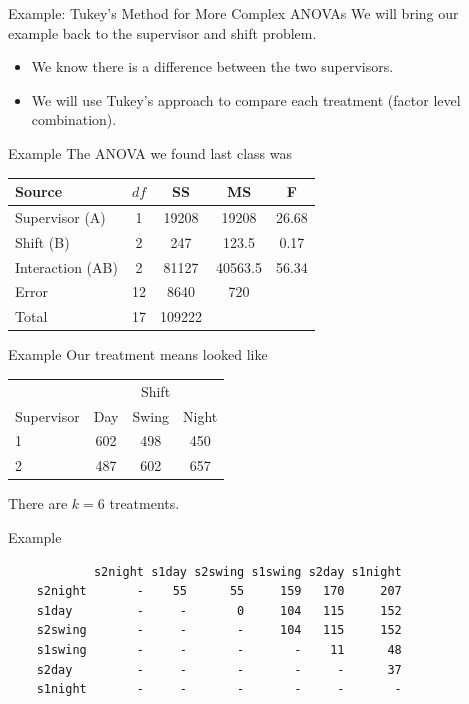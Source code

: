 \begin{frame}{Example: Tukey's Method for More Complex ANOVAs}
    We will bring our example back to the supervisor and shift problem.
    \begin{itemize}
        \item We know there is a difference between the two supervisors.
        \item We will use Tukey's approach to compare each treatment (factor level combination).
    \end{itemize}
\end{frame}

\begin{frame}{Example}
    The ANOVA we found last class was
    \begin{table}[h]
        \centering
        \begin{tabular}{lcccc}
            \hline
            Source & $df$ & SS & MS & F \\ 
            \hline
            Supervisor (A)   & 1 & 19208 & 19208 & 26.68 \\
            Shift (B)        & 2 & 247   & 123.5 & 0.17 \\
            Interaction (AB) & 2 & 81127 & 40563.5 & 56.34 \\
            Error            & 12 & 8640 & 720 & \\
            Total            & 17 & 109222 & & \\
            \hline
        \end{tabular}
    \end{table}
\end{frame}

\begin{frame}{Example}
    Our treatment means looked like 
    \begin{table}[h]
        \centering
        \begin{tabular}{lccc}
             & \multicolumn{3}{c}{Shift} \\
            \cline{2-4}
            Supervisor & Day & Swing & Night \\
            \hline
            1 & 602 & 498 & 450 \\
            2 & 487 & 602 & 657 \\
            \hline
        \end{tabular}
    \end{table}
    There are $k=6$ treatments.
\end{frame}

\begin{frame}[fragile]{Example}
    \begin{verbatim}
            s2night s1day s2swing s1swing s2day s1night
    s2night       -    55      55     159   170     207
    s1day         -     -       0     104   115     152
    s2swing       -     -       -     104   115     152
    s1swing       -     -       -       -    11      48
    s2day         -     -       -       -     -      37
    s1night       -     -       -       -     -       -
    \end{verbatim}
\end{frame}
